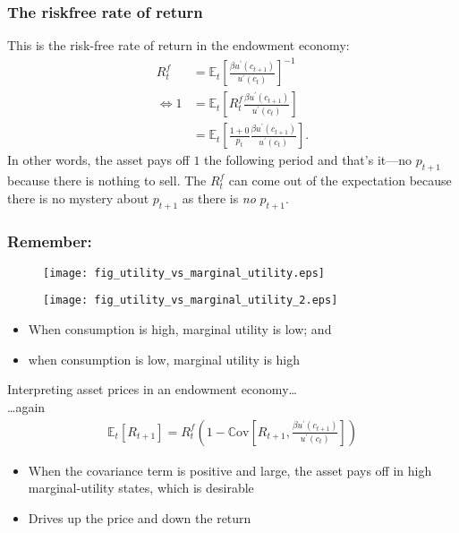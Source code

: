 \documentclass[presentation,dvipsnames]{beamer}
\begin{document}
\begin{frame}
\frametitle{The riskfree rate of return}
This is the risk-free rate of return in the endowment economy:
\begin{align*}
R^{f}_{t} &= \mathbb{E}_{t} \left[ \frac{\beta u^{\prime}(c_{t+1})}{u^{\prime}(c_{t})} \right]^{-1} \\
\iff 1 &= \mathbb{E}_{t} \left[ R^{f}_{t} \frac{\beta u^{\prime}(c_{t+1})}{u^{\prime}(c_{t})} \right] \\
&= \mathbb{E}_{t} \left[ \frac{1 + 0}{p_{t}} \frac{\beta u^{\prime}(c_{t+1})}{u^{\prime}(c_{t})} \right].
\end{align*}
In other words, the asset pays off $1$ the following period and that's it---no $p_{t+1}$ because there is nothing to sell.
The $R^{f}_{t}$ can come out of the expectation because there is no mystery about $p_{t+1}$ as there is \emph{no} $p_{t+1}$.
\end{frame}


\begin{frame}
\frametitle{Remember:}
\begin{figure}
\centering
\begin{minipage}{.5\textwidth}
  \centering
  \texttt{[image: fig\_utility\_vs\_marginal\_utility.eps]}
\end{minipage}%
\begin{minipage}{.5\textwidth}
  \centering
  \texttt{[image: fig\_utility\_vs\_marginal\_utility\_2.eps]}
\end{minipage}
\end{figure}
\begin{itemize}[label={--}]
\item When consumption is high, marginal utility is low; and
\item when consumption is low, marginal utility is high
\end{itemize}
\end{frame}

\begin{frame}[label=sec-4-6]{Interpreting asset prices in an endowment economy\dots{} \\ \dots{}again}
\begin{align*}
\mathbb{E}_{t} \left[ R_{t+1} \right] = R^{f}_{t} \left( 1 - \mathbb{C} \text{ov} \left[ R_{t+1}, \frac{\beta u^{\prime}(c_{t+1})}{u^{\prime}(c_{t})} \right] \right)
\end{align*}

\begin{itemize}[label={--}]
\item When the covariance term is positive and large,
the asset pays off in high marginal-utility states, which is desirable
\item Drives up the price and down the return
\end{itemize}
\end{frame}
\end{document}
